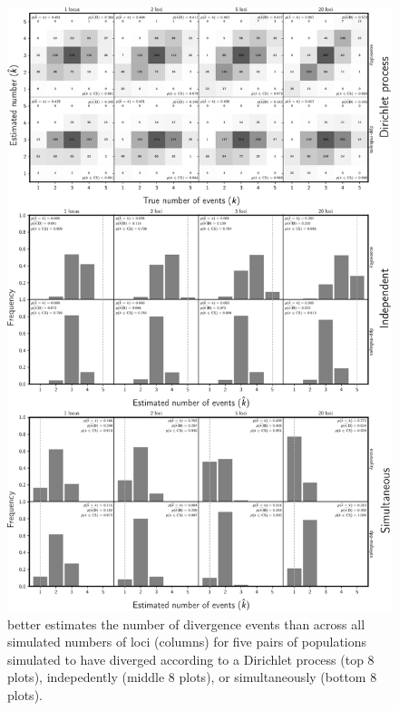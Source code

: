 \begin{figure}[htbp]
    \begin{center}
        \includegraphics[width=\textwidth,height=0.9\textheight,keepaspectratio]{../images/from-project-repo/plots/tex-plot-grids/grid-nevents-cropped.pdf}
        \caption{
            \scriptsize
            \Ecoevolity better estimates the number of divergence
            events than \dppmsbayes across all simulated numbers of
            loci (columns) for five pairs of populations simulated to have
            diverged according to a Dirichlet process (top 8 plots),
            indepedently (middle 8 plots),
            or
            simultaneously (bottom 8 plots).
            \neventsshadingdescription{}
            \neventsplotannotations{}
        }
        \label{fig:nevents}
    \end{center}
\end{figure}

